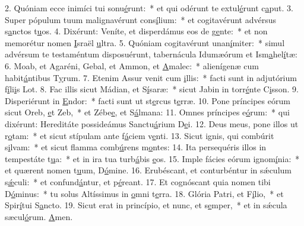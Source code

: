 2. Quóniam ecce inimíci tui sonu\uline{é}runt:~* et qui odérunt te extul\uline{é}runt c\uline{a}put.
3. Super pópulum tuum malignavérunt cons\uline{í}lium:~* et cogitavérunt advérsus s\uline{a}nctos t\uline{u}os.
4. Dixérunt: Veníte, et disperdámus eos de g\uline{e}nte:~* et non memorétur nomen \uline{I}sraël \uline{u}ltra.
5. Quóniam cogitavérunt unan\uline{í}miter:~* simul advérsum te testaméntum disposuérunt, tabernácula Idumæórum et Ism\uline{a}hel\uline{í}tæ:
6. Moab, et Agaréni, Gebal, et Ammon, et \uline{A}malec:~* alienígenæ cum habit\uline{á}ntibus T\uline{y}rum.
7. Etenim Assur venit cum \uline{i}llis:~* facti sunt in adjutórium f\uline{í}li\uline{i}s Lot.
8. Fac illis sicut Mádian, et S\uline{í}saræ:~* sicut Jabin in torr\uline{é}nte C\uline{i}sson.
9. Disperiérunt in \uline{E}ndor:~* facti sunt ut st\uline{e}rcus t\uline{e}rræ.
10. Pone príncipes eórum sicut Oreb, \uline{e}t Zeb,~* et Zébe\uline{e}, et S\uline{á}lmana:
11. Omnes príncipes e\uline{ó}rum:~* qui dixérunt: Hereditáte possideámus Sanctu\uline{á}rium D\uline{e}i.
12. Deus meus, pone illos ut r\uline{o}tam:~* et sicut stípulam ante f\uline{á}ciem v\uline{e}nti.
13. Sicut ignis, qui combúrit s\uline{i}lvam:~* et sicut flamma comb\uline{ú}rens m\uline{o}ntes:
14. Ita persequéris illos in tempestáte t\uline{u}a:~* et in ira tua turb\uline{á}bis \uline{e}os.
15. Imple fácies eórum ignom\uline{í}nia:~* et quærent nomen t\uline{u}um, D\uline{ó}mine.
16. Erubéscant, et conturbéntur in sǽculum s\uline{ǽ}culi:~* et confund\uline{á}ntur, et p\uline{é}reant.
17. Et cognóscant quia nomen tibi D\uline{ó}minus:~* tu solus Altíssimus in \uline{o}mni t\uline{e}rra.
18. Glória Patri, et F\uline{í}lio,~* et Spir\uline{í}tui S\uline{a}ncto.
19. Sicut erat in princípio, et nunc, et s\uline{e}mper,~* et in sǽcula sæcul\uline{ó}rum. \uline{A}men.
